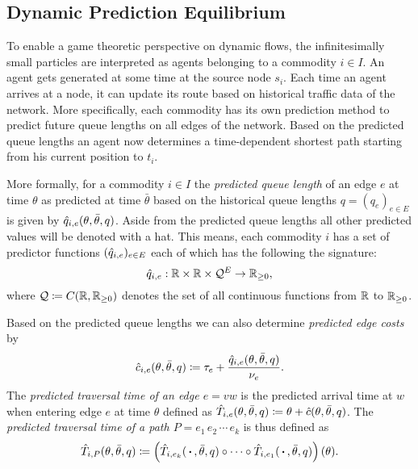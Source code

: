 \subsection{Dynamic Prediction Equilibrium}\label{subsec-dynamic-prediction-equilibrium}

To enable a game theoretic perspective on dynamic flows, the infinitesimally small particles are interpreted as agents belonging to a commodity $i\in I$.
An agent gets generated at some time at the source node $s_i$.
Each time an agent arrives at a node, it can update its route based on historical traffic data of the network.
More specifically, each commodity has its own prediction method to predict future queue lengths on all edges of the network.
Based on the predicted queue lengths an agent now determines a time-dependent shortest path starting from his current position to $t_i$.

More formally, for a commodity $i\in I$ the \emph{predicted queue length} of an edge $e$ at time $\theta$ as predicted at time $\bar\theta$ based on the historical queue lengths $q=(q_e)_{e\in E}$ is given by $\hat q_{i,e}(\theta, \bar\theta, q)$.
Aside from the predicted queue lengths all other predicted values will be denoted with a hat. 
This means, each commodity $i$ has a set of predictor functions $(\hat q_{i,e})_{e\in E}$ each of which has the following the signature:
\[
    \hat q_{i,e} : \mathbb{R} \times \mathbb{R} \times \mathcal{Q}^E \rightarrow \mathbb{R}_{\geq0},
\]
where $\mathcal{Q}\coloneqq {C}{\left({\mathbb{R}},{\mathbb{R}_{\geq0}}\right)}$ denotes the set of all continuous functions from $\mathbb{R}$ to $\mathbb{R}_{\geq0}$.

Based on the predicted queue lengths we can also determine \emph{predicted edge costs} by \[
    \hat c_{i,e}(\theta, \bar\theta, q) \coloneqq \tau_e + \frac{\hat q_{i,e}(\theta, \bar\theta, q)}{\nu_e}.
\]
The \emph{predicted traversal time of an edge $e=vw$} is the predicted arrival time at $w$ when entering edge $e$ at time $\theta$ defined as $\hat T_{i,e}(\theta, \bar\theta, q) \coloneqq \theta + \hat c(\theta, \bar\theta, q)$.
The \emph{predicted traversal time of a path $P=e_1\,e_2\,\cdots\,e_k$} is thus defined as \[
    \hat T_{i,P}(\theta,\bar\theta, q) \coloneqq \left(
        \hat T_{i,e_k}(\,\boldsymbol{\cdot}\,, \bar\theta, q) \circ \cdots \circ \hat T_{i,e_1}(\,\boldsymbol{\cdot}\,, \bar\theta, q)
    \right) (\theta).
\]

